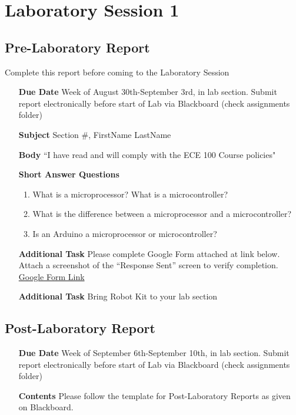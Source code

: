 \chapter{Laboratory Session 1}
\section{Pre-Laboratory Report}
Complete this report before coming to the Laboratory Session

\begin{itemize}
	
	\item[\textbf{Due Date}]{Week of August 30th-September 3rd, \the\year \space in lab section. Submit report electronically before start of Lab via Blackboard (check assignments folder)}
	\item[\textbf{Subject}]{Section \#, FirstName LastName}
	\item[\textbf{Body}]{``I have read and will comply with the ECE 100 Course policies"}
	\item[\textbf{Short Answer Questions}]{
		\begin{enumerate}
			\item{What is a microprocessor? What is a microcontroller?}
			\item{What is the difference between a microprocessor and a microcontroller?}
			\item{Is an Arduino a microprocessor or microcontroller?}
		\end{enumerate}
	}
	\item[\textbf{Additional Task}]{Please complete Google Form attached at link below. Attach a screenshot of the “Response Sent” screen to verify completion. \href{https://docs.google.com/forms/d/1YDT2DtzWYms2BeuS1Wrks3ZANfYgNUmNhEl2PUm63Qc/prefill}{Google Form Link}}
	\item[\textbf{Additional Task}]{Bring Robot Kit to your lab section}
\end{itemize}

\section{Post-Laboratory Report}

\begin{itemize}
	\item[\textbf{Due Date}]{Week of September 6th-September 10th, \the\year \space in lab section. Submit report electronically before start of Lab via Blackboard (check assignments folder)}
	\item[\textbf{Contents}]{Please follow the template for Post-Laboratory Reports as given on Blackboard.}
\end{itemize}
